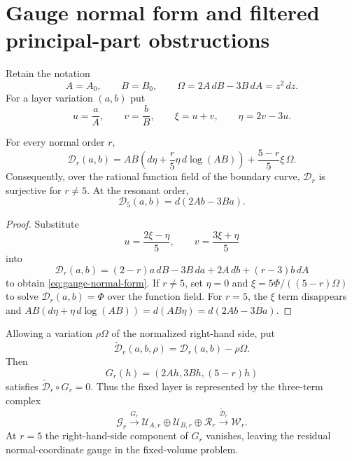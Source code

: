 \section{Gauge normal form and filtered principal-part obstructions}
\label{sec:filtered-principal-parts}

Retain the notation
\[
 A=A_0,\qquad B=B_0,\qquad
 \Omega=2A\,dB-3B\,dA=z^2\,dz.
\]
For a layer variation $(a,b)$ put
\[
 u=\frac aA,\qquad v=\frac bB,\qquad
 \xi=u+v,\qquad \eta=2v-3u.
\]

\begin{proposition}
\label{prop:gauge-normal-form}
For every normal order $r$,
\begin{equation}
\label{eq:gauge-normal-form}
 \boxed{
 \mathscr D_r(a,b)
 =AB\left(d\eta+\frac r5\eta\,d\log(AB)\right)
 +\frac{5-r}{5}\xi\,\Omega.}
\end{equation}
Consequently, over the rational function field of the boundary curve,
$\mathscr D_r$ is surjective for $r\ne5$.  At the resonant order,
\begin{equation}
\label{eq:resonant-exact}
 \boxed{\mathscr D_5(a,b)=d(2Ab-3Ba).}
\end{equation}
\end{proposition}

\begin{proof}
Substitute
\[
 u=\frac{2\xi-\eta}{5},\qquad
 v=\frac{3\xi+\eta}{5}
\]
into
\[
 \mathscr D_r(a,b)
 =(2-r)a\,dB-3B\,da+2A\,db+(r-3)b\,dA
\]
to obtain \eqref{eq:gauge-normal-form}.  If $r\ne5$, set $\eta=0$ and
$\xi=5\Phi/((5-r)\Omega)$ to solve $\mathscr D_r(a,b)=\Phi$ over the
function field.  For $r=5$, the $\xi$ term disappears and
$AB(d\eta+\eta\,d\log(AB))=d(AB\eta)=d(2Ab-3Ba)$.
\end{proof}

\begin{remark}
Allowing a variation $\rho\Omega$ of the normalized right-hand side, put
\[
 \widetilde{\mathscr D}_r(a,b,\rho)
 =\mathscr D_r(a,b)-\rho\Omega.
\]
Then
\[
 G_r(h)=(2Ah,3Bh,(5-r)h)
\]
satisfies $\widetilde{\mathscr D}_r\circ G_r=0$.  Thus the fixed layer is
represented by the three-term complex
\[
 \mathcal G_r\xrightarrow{G_r}
 \mathcal U_{A,r}\oplus\mathcal U_{B,r}\oplus\mathcal R_r
 \xrightarrow{\widetilde{\mathscr D}_r}\mathcal W_r.
\]
At $r=5$ the right-hand-side component of $G_r$ vanishes, leaving the
residual normal-coordinate gauge in the fixed-volume problem.
\end{remark}

